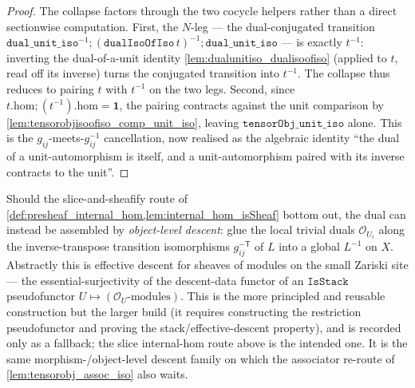 \begin{proof}
  The collapse factors through the two cocycle helpers rather than a direct sectionwise computation.
  First, the \(N\)-leg --- the dual-conjugated transition
  \(\mathtt{dual\_unit\_iso}^{-1} \mathbin{;} (\mathtt{dualIsoOfIso}\,t)^{-1} \mathbin{;}
  \mathtt{dual\_unit\_iso}\) --- is exactly \(t^{-1}\): inverting the dual-of-a-unit identity
  \cref{lem:dualunitiso_dualisoofiso} (applied to \(t\), read off its inverse) turns the conjugated
  transition into \(t^{-1}\). The collapse thus reduces to pairing \(t\) with \(t^{-1}\) on the two
  legs. Second, since \(t.\mathrm{hom} \mathbin{;} (t^{-1}).\mathrm{hom} = \mathbf 1\), the pairing
  contracts against the unit comparison by \cref{lem:tensorobjisoofiso_comp_unit_iso}, leaving
  \(\mathtt{tensorObj\_unit\_iso}\) alone. This is the \(g_{ij}\)-meets-\(g_{ij}^{-1}\) cancellation,
  now realised as the algebraic identity ``the dual of a unit-automorphism is itself, and a
  unit-automorphism paired with its inverse contracts to the unit''.
\end{proof}

\begin{remark}
  \label{rem:dual_via_stack}
  Should the slice-and-sheafify route of
  \cref{def:presheaf_internal_hom,lem:internal_hom_isSheaf} bottom out, the dual can
  instead be assembled by \emph{object-level descent}: glue the local trivial duals
  \(\mathcal{O}_{U_i}\) along the inverse-transpose transition isomorphisms
  \(g_{ij}^{-\mathsf{T}}\) of \(L\) into a global \(L^{-1}\) on \(X\). Abstractly this
  is effective descent for sheaves of modules on the small Zariski site --- the
  essential-surjectivity of the descent-data functor of an \(\mathtt{IsStack}\)
  pseudofunctor \(U \mapsto (\mathcal{O}_U\text{-modules})\). This is the more
  principled and reusable construction but the larger build (it requires constructing
  the restriction pseudofunctor and proving the stack/effective-descent property),
  and is recorded only as a fallback; the slice internal-hom route above is the
  intended one. It is the same morphism-/object-level descent family on which the
  associator re-route of \cref{lem:tensorobj_assoc_iso} also waits.
\end{remark}

